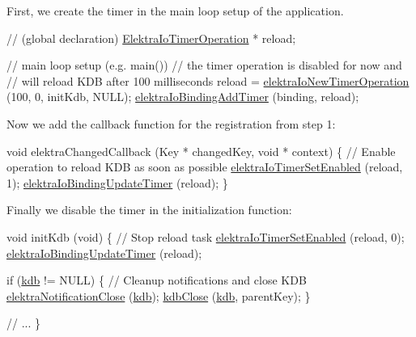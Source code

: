 First, we create the timer in the main loop setup of the application.


\begin{DoxyCode}
\textcolor{comment}{// (global declaration)}
\hyperlink{kdbio_8h_a09c40c890207a8244fc39bb930fee1fa}{ElektraIoTimerOperation} * reload;

\textcolor{comment}{// main loop setup (e.g. main())}
\textcolor{comment}{// the timer operation is disabled for now and}
\textcolor{comment}{// will reload KDB after 100 milliseconds}
reload = \hyperlink{io_8c_a67a0a81d263e0a7853809144c4ea5198}{elektraIoNewTimerOperation} (100, 0, initKdb, NULL);
\hyperlink{io_8c_a1d61dca5ec35900c33224d82711c0bdb}{elektraIoBindingAddTimer} (binding, reload);
\end{DoxyCode}


Now we add the callback function for the registration from step 1\+:


\begin{DoxyCode}
\textcolor{keywordtype}{void} elektraChangedCallback (Key * changedKey, \textcolor{keywordtype}{void} * context)
\{
        \textcolor{comment}{// Enable operation to reload KDB as soon as possible}
        \hyperlink{io_8c_a301cebc4da212bdb3aac0ad84f70ad85}{elektraIoTimerSetEnabled} (reload, 1);
        \hyperlink{io_8c_add5679a2ff842d88435938d629497e27}{elektraIoBindingUpdateTimer} (reload);
\}
\end{DoxyCode}


Finally we disable the timer in the initialization function\+:


\begin{DoxyCode}
\textcolor{keywordtype}{void} initKdb (\textcolor{keywordtype}{void})
\{
        \textcolor{comment}{// Stop reload task}
        \hyperlink{io_8c_a301cebc4da212bdb3aac0ad84f70ad85}{elektraIoTimerSetEnabled} (reload, 0);
        \hyperlink{io_8c_add5679a2ff842d88435938d629497e27}{elektraIoBindingUpdateTimer} (reload);

        \textcolor{keywordflow}{if} (\hyperlink{namespacekdb}{kdb} != NULL)
        \{
                \textcolor{comment}{// Cleanup notifications and close KDB}
                \hyperlink{group__kdbnotification_ga5685dafbd4131011365628d6d9213594}{elektraNotificationClose} (\hyperlink{namespacekdb}{kdb});
                \hyperlink{group__kdb_gadb54dc9fda17ee07deb9444df745c96f}{kdbClose} (\hyperlink{namespacekdb}{kdb}, parentKey);
        \}

        \textcolor{comment}{// ...}
\}
\end{DoxyCode}


